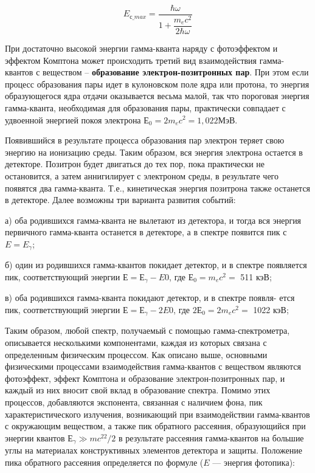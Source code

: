 	\begin{equation}\label{E_compton}
	E_{с \_ max} = \dfrac{\hbar \omega}{1 + \dfrac{m_ec^2}{2\hbar\omega}}
	\end{equation}
	
	При достаточно высокой энергии гамма-кванта наряду с фотоэффектом и эффектом Комптона может происходить третий вид взаимодействия гамма-квантов с веществом – \textbf{образование электрон-позитронных пар}. При этом если процесс образования пары идет в кулоновском поле ядра или протона, то энергия образующегося ядра отдачи оказывается весьма малой, так что пороговая энергия гамма-кванта, необходимая для образования пары, практически совпадает с удвоенной энергией покоя электрона $ Е_0 = 2m_ec^2 =1,022  $МэВ.
	
	Появившийся в результате процесса образования пар электрон теряет свою энергию на ионизацию среды. Таким образом, вся энергия электрона остается в детекторе. Позитрон будет двигаться до тех пор, пока практически не остановится, а затем аннигилирует с электроном среды, в результате чего появятся два гамма-кванта. Т.е., кинетическая энергия позитрона также останется в детекторе. Далее возможны три варианта развития событий:
	
	а) оба родившихся гамма-кванта не вылетают из детектора, и тогда вся энергия первичного гамма-кванта останется в детекторе, а в спектре появится пик с $ E = E_\gamma $;
	
	б) один из родившихся гамма-квантов покидает детектор, и в спектре появляется пик, соответствующий энергии $  Е = Е_\gamma - E0 $, где $ Е_0 = m_ec^2 = $ 511 кэВ;
	
	в) оба родившихся гамма-кванта покидают детектор, и в спектре появля- ется пик, соответствующий энергии $  Е = Е_\gamma - 2E0 $, где $ 2Е_0 = 2m_ec^2 = $ 1022 кэВ;
	
	Таким образом, любой спектр, получаемый с помощью гамма-спектрометра, описывается несколькими компонентами, каждая из которых связана с определенным физическим процессом. Как описано выше, основными физическими процессами взаимодействия гамма-квантов с веществом являются фотоэффект, эффект Комптона и образование электрон-позитронных пар, и каждый из них вносит свой вклад в образование спектра. Помимо этих процессов, добавляются экспонента, связанная с наличием фона, пик характеристического излучения, возникающий при взаимодействии гамма-квантов с окружающим веществом, а также пик обратного рассеяния, образующийся при энергии квантов $ Е_\gamma \gg mc^22/2 $ в результате рассеяния гамма-квантов на большие углы на материалах конструктивных элементов детектора и защиты. Положение пика обратного рассеяния определяется по формуле ($ E $ --- энергия фотопика):
	

